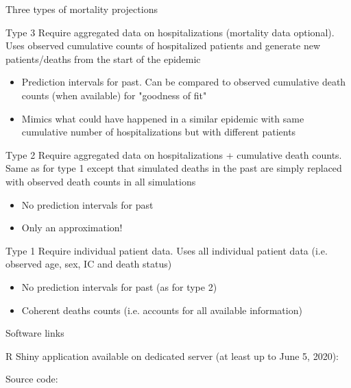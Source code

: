 \documentclass[t,9pt,xcolor=dvipsnames]{beamer}              %
\begin{document}
\begin{frame}{Three types of mortality projections}
\justifying

\alert{Type 3}
Require aggregated data on hospitalizations (mortality data optional). Uses observed cumulative counts of hospitalized patients and generate new patients/deaths from the start of the epidemic
\begin{itemize}
\item Prediction intervals for past. Can be compared to observed cumulative death counts (when available) for "goodness of fit"
\item Mimics what could have happened in a similar epidemic with same cumulative number of hospitalizations but with different patients
\end{itemize}
\pause

\alert{Type 2}
Require aggregated data on hospitalizations + cumulative death counts. Same as for type 1 except that simulated deaths in the past are simply replaced with observed death counts in all simulations
\begin{itemize}
\item No prediction intervals for past
\item Only an approximation!
\end{itemize}
\pause

\alert{Type 1}
Require individual patient data. Uses all individual patient data (i.e. observed age, sex, IC and death status)
\begin{itemize}
\item No prediction intervals for past (as for type 2)
\item Coherent deaths counts (i.e. accounts for all available information)
\end{itemize}


\note{
\tiny
\justifying

}
\end{frame}

\begin{frame}{Software links}
\justifying

\bigskip
R Shiny application available on dedicated server (at least up to June 5, 2020):
\bigskip

\begin{center}
\href{https://stat-cmb.ddns.net/COVID19/}{}
\end{center}

Source code: 
\begin{center}
\href{https://github.com/kilou/COVID19}{}
\end{center}


\note{
\tiny
\justifying

}
\end{frame}
\end{document}
